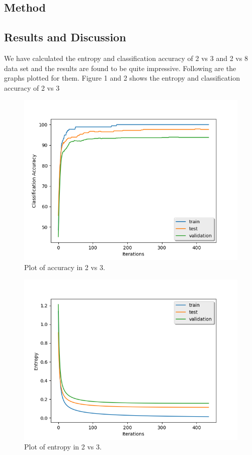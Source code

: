 \documentclass{article} %
\begin{document}
\subsection{Method}
\subsection{Results and Discussion}

We have calculated the entropy and classification accuracy of 2 vs 3 and 2 vs 8 data set and the results are found to be quite impressive. Following are the graphs plotted for them. Figure 1 and 2 shows the entropy and classification accuracy of 2 vs 3

\begin{figure}[h]
\begin{center}
\includegraphics[width=0.8\linewidth]{plt_2vs3_accuracy.png}
\end{center}
\caption{Plot of accuracy in 2 vs 3.}
\end{figure}

\begin{figure}[h]
\begin{center}
\includegraphics[width=0.8\linewidth]{plt_2vs3_losses.png}
\end{center}
\caption{Plot of entropy in 2 vs 3.}
\end{figure}
\end{document}
